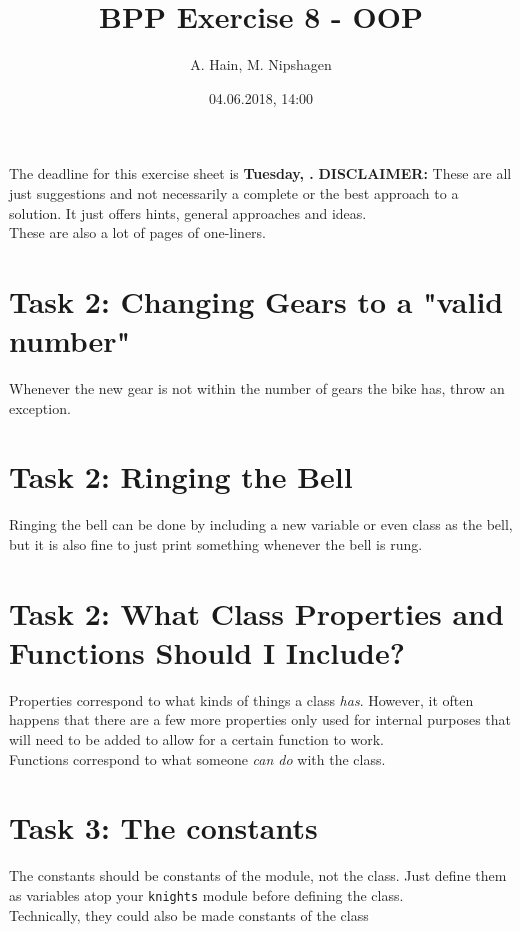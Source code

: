 

\title{BPP Exercise 8 - OOP}
\author{A. Hain, M. Nipshagen}
\date{04.06.2018, 14:00}

\makeatletter
\let\thetitle\@title
\let\theauthor\@author
\let\thedate\@date
\makeatother

\newcommand\itemsub[1]{
	\begin{itemize}
		\item #1
	\end{itemize}
}

\setcounter{secnumdepth}{0}


The deadline for this exercise sheet is \textbf{Tuesday, \thedate.}
\tableofcontents
\vspace{12pt}\noindent
\textbf{DISCLAIMER:} These are all just suggestions and not necessarily a complete
or the best approach to a solution. It just offers hints, general approaches
and ideas.\\
These are also a lot of pages of one-liners.
\pagebreak

\section{Task 2: Changing Gears to a "valid number"}
Whenever the new gear is not within the number of gears the bike has, throw an exception.

\pagebreak

\section{Task 2: Ringing the Bell}
Ringing the bell can be done by including a new variable or even class as the bell,
but it is also fine to just print something whenever the bell is rung.

\pagebreak

\section{Task 2: What Class Properties and Functions Should I Include?}
Properties correspond to what kinds of things a class \textit{has}.
However, it often happens that there are a few more properties only used for
internal purposes that will need to be added to allow for a certain function to work.\\
Functions correspond to what someone \textit{can do} with the class.

\pagebreak

\section{Task 3: The constants}
The constants should be constants of the module, not the class. Just define them
as variables atop your \texttt{knights} module before defining the class.\\
Technically, they could also be made constants of the class
\pagebreak

